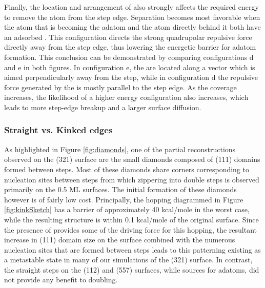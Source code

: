 Finally, the location and arrangement of  also strongly affects the
required energy to remove the atom from the step edge. Separation becomes most
favorable when the atom that is becoming the adatom and the atom directly
behind it both have an adsorbed . This configuration directs the strong
quadrupolar repulsive force directly away from the step edge, thus lowering the
energetic barrier for adatom formation.  This conclusion can be demonstrated by
comparing configurations d and e in both figures. In configuration e, the
 are located along a vector which is aimed perpendicularly away from the
step, while in configuration d the repulsive force generated by the  is
mostly parallel to the step edge. As the coverage
increases, the likelihood of a higher energy configuration also increases,
which leads to more step-edge breakup and a larger surface diffusion.

\subsubsection{Straight vs. Kinked edges}
As highlighted in Figure \ref{fig:diamonds}, one of the partial reconstructions
observed on the (321) surface are the small diamonds composed of (111) domains
formed between steps. Most of these diamonds share corners corresponding to
nucleation sites between steps from which zippering into double steps is
observed primarily on the 0.5 ML surfaces. The initial formation of these
diamonds however is of fairly low cost. Principally, the hopping
diagrammed in Figure \ref{fig:kinkSketch} has a barrier of approximately 40
kcal/mole in the worst case, while the resulting structure is within 0.1 kcal/mole of the original
surface. Since the presence of  provides some of the driving force for
this hopping, the resultant increase in (111) domain size on the surface
combined with the numerous nucleation sites that are formed between steps leads
to this patterning existing as a metastable state in many of our simulations of
the (321) surface. In contrast, the straight steps on the (112) and (557)
surfaces, while sources for adatoms, did not provide any benefit to doubling.

